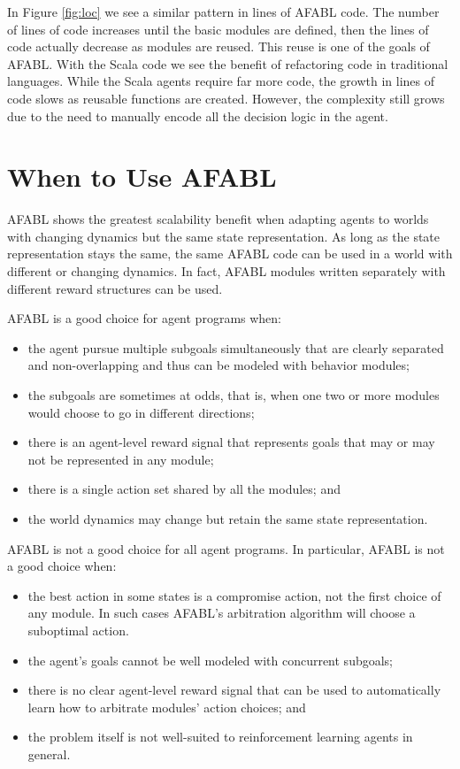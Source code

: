 In Figure \ref{fig:loc} we see a similar pattern in lines of AFABL code. The number of lines of code increases until the basic modules are defined, then the lines of code actually decrease as modules are reused. This reuse is one of the goals of AFABL. With the Scala code we see the benefit of refactoring code in traditional languages. While the Scala agents require far more code, the growth in lines of code slows as reusable functions are created. However, the complexity still grows due to the need to manually encode all the decision logic in the agent.


\section{When to Use AFABL}

AFABL shows the greatest scalability benefit when adapting agents to worlds with changing dynamics but the same state representation. As long as the state representation stays the same, the same AFABL code can be used in a world with different or changing dynamics. In fact, AFABL modules written separately with different reward structures can be used.

AFABL is a good choice for agent programs when:

\begin{itemize}
\item the agent pursue multiple subgoals simultaneously that are clearly separated and non-overlapping and thus can be modeled with behavior modules;
\item the subgoals are sometimes at odds, that is, when one two or more modules would choose to go in different directions;
\item there is an agent-level reward signal that represents goals that may or may not be represented in any module;
\item there is a single action set shared by all the modules; and
\item the world dynamics may change but retain the same state representation.
\end{itemize}

AFABL is not a good choice for all agent programs. In particular, AFABL is not a good choice when:
\begin{itemize}
\item the best action in some states is a compromise action, not the first choice of any module. In such cases AFABL's arbitration algorithm will choose a suboptimal action.
\item the agent's goals cannot be well modeled with concurrent subgoals;
\item there is no clear agent-level reward signal that can be used to automatically learn how to arbitrate modules' action choices; and
\item the problem itself is not well-suited to reinforcement learning agents in general.
\end{itemize}
